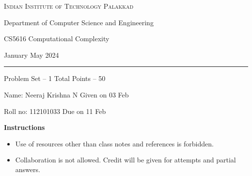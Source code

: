 \documentclass[11pt, a4paper,answers]{exam}
\begin{document}
	\noindent
	\begin{minipage}[l]{0.1\textwidth}
		\noindent
	\end{minipage}
	\hfill
	\begin{minipage}[c]{0.8\textwidth}
		\begin{center}
			{\large \textsc{\textcolor{iitpkdcolor}{Indian Institute of Technology Palakkad}} \par
				\small	Department of Computer Science and Engineering	\par
				\large	CS5616 Computational Complexity \par 
				\small January May 2024}
		\end{center}
	\end{minipage}
	\par
	\vspace{2mm}
	\hrule
	\vspace{2mm}
	\begin{minipage}{0.9\textwidth} 
		\textsf{Problem Set} -- 1  \hfill  \textsf{Total Points} -- 50
		
		{\small \textsf{Name}: Neeraj Krishna N \hfill \small \textsf{Given on} 03 Feb}
		
		{\small \textsf{Roll no}: 112101033 \hfill \small \textsf{Due on} 11 Feb}
	\end{minipage}
	\vspace{0.2in}
	\noindent
	
	\textbf{Instructions}
	\begin{itemize}   \setlength\itemsep{0.1mm}
		\item {\sf  Use of resources other than class notes and references is forbidden.}
		\item {\sf Collaboration is not allowed. Credit will be given for attempts and partial answers.}
	\end{itemize}
\end{document}
